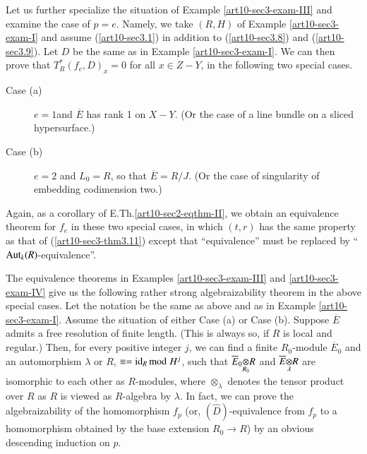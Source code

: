 \begin{romanexam}\label{art10-sec3-exam-IV}
Let us further specialize the situation of Example \ref{art10-sec3-exam-III} and examine the case of $p=e$. Namely, we take $(R,H)$ of Example \ref{art10-sec3-exam-I} and assume (\ref{art10-sec3.1}) in addition to (\ref{art10-sec3.8}) and (\ref{art10-sec3.9}). Let $D$ be the same as in Example \ref{art10-sec3-exam-I}. We can then prove that $T^{*}_{R}(f_{e},D)_{x}=0$ for all $x\in Z-Y$, in the following two special cases.
\end{romanexam}

\begin{description}
\item[Case (a)] $e=1$\pageoriginale and $\overline{E}$ has rank 1 on $X-Y$. (Or the case of a line bundle on a sliced hypersurface.)

\item[Case (b)] $e=2$ and $L_{0}=R$, so that $\overline{E}=R/J$. (Or the case of singularity of embedding codimension two.)
\end{description}
Again, as a corollary of E.Th.\ref{art10-sec2-eqthm-II}, we obtain an equivalence theorem for $f_{e}$ in these two special cases, in which $(t,r)$ has the same property as that of (\ref{art10-sec3-thm3.11}) except that ``equivalence'' must be replaced by ``$\operatorname{\mathrm{Aut}}_{k}(R)$-equivalence''.

\begin{remark}\label{art10-sec3-rem3.12}
The equivalence theorems in Examples \ref{art10-sec3-exam-III} and \ref{art10-sec3-exam-IV} give us the following rather strong algebraizability theorem in the above special cases. Let the notation be the same as above and as in Example \ref{art10-sec3-exam-I}. Assume the situation of either Case (a) or Case (b). Suppose $\overline{E}$ admits a free resolution of finite length. (This is always so, if $R$ is local and regular.) Then, for every positive integer $j$, we can find a finite $R_{0}$-module $\overline{E}_{0}$ and an automorphism $\lambda$ or $R$, $\equiv =\operatorname{\mathrm{id}}_{R}{\rm{mod}}\kern.3em H^{j}$, such that $\foprod{\overline{E}_{0}}{R}{R_{0}}$ and $\foprod{\overline{E}}{R}{\lambda}$ are isomorphic to each other as $R$-modules, where $\otimes_{\lambda}$ denotes the tensor product over $R$ as $R$ is viewed as $R$-algebra by $\lambda$. In fact, we can prove the algebraizability of the homomorphism $f_{p}$ (or, $(\widehat{D})$-equivalence from $f_{p}$ to a homomorphism obtained by the base extension $R_{0}\to R$) by an obvious descending induction on $p$.
\end{remark}

